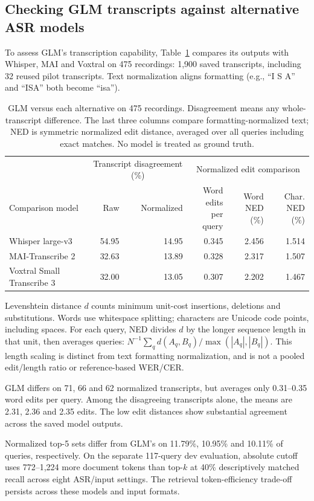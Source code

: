 \subsection{Checking GLM transcripts against alternative ASR models}
To assess GLM's transcription capability, Table~\ref{tab:asr-agreement} compares its outputs with Whisper, MAI and Voxtral on 475 recordings: 1,900 saved transcripts, including 32 reused pilot transcripts. Text normalization aligns formatting (e.g., ``I S A'' and ``ISA'' both become ``isa'').

\begin{table}[h]
\centering
\caption{GLM versus each alternative on 475 recordings. Disagreement means any whole-transcript difference. The last three columns compare formatting-normalized text; NED is symmetric normalized edit distance, averaged over all queries including exact matches. No model is treated as ground truth.}
\label{tab:asr-agreement}
\small
\begin{tabular}{lrrrrr}
\toprule
& \multicolumn{2}{c}{Transcript disagreement (\%)} & \multicolumn{3}{c}{Normalized edit comparison}\\
Comparison model & Raw & Normalized & \shortstack{Word edits\\per query} & \shortstack{Word NED\\(\%)} & \shortstack{Char. NED\\(\%)}\\
\midrule
Whisper large-v3 & 54.95 & 14.95 & 0.345 & 2.456 & 1.514\\
MAI-Transcribe 2 & 32.63 & 13.89 & 0.328 & 2.317 & 1.507\\
Voxtral Small Transcribe 3 & 32.00 & 13.05 & 0.307 & 2.202 & 1.467\\
\bottomrule
\end{tabular}
\end{table}

Levenshtein distance $d$ counts minimum unit-cost insertions, deletions and substitutions. Words use whitespace splitting; characters are Unicode code points, including spaces. For each query, NED divides $d$ by the longer sequence length in that unit, then averages queries: $N^{-1}\sum_q d(A_q,B_q)/\max(|A_q|,|B_q|)$. This length scaling is distinct from text formatting normalization, and is not a pooled edit/length ratio or reference-based WER/CER.

GLM differs on 71, 66 and 62 normalized transcripts, but averages only 0.31--0.35 word edits per query. Among the disagreeing transcripts alone, the means are 2.31, 2.36 and 2.35 edits. The low edit distances show substantial agreement across the saved model outputs.

Normalized top-5 sets differ from GLM's on 11.79\%, 10.95\% and 10.11\% of queries, respectively. On the separate 117-query dev evaluation, absolute cutoff uses 772--1,224 more document tokens than top-$k$ at 40\% descriptively matched recall across eight ASR/input settings. The retrieval token-efficiency trade-off persists across these models and input formats.
